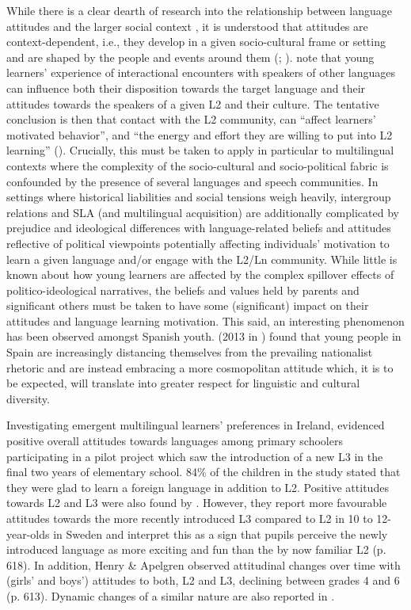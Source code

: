 \documentclass[output=paper]{../langscibook}
\begin{document}
While there is a clear dearth of research into the relationship between language attitudes and the larger social context \citep[28]{Enever2009}, it is understood that attitudes are context-dependent, i.e., they develop in a given socio-cultural frame or setting and are shaped by the people and events around them (\citealt[91]{JessnerMayer2017}; \citealt[25]{Munoz2014}). \citet{CsizerKormos2009} note that young learners’ experience of interactional encounters with speakers of other languages can influence both their disposition towards the target language and their attitudes towards the speakers of a given L2 and their culture. The tentative conclusion is then that contact with the L2 community, can “affect learners’ motivated behavior”, and “the energy and effort they are willing to put into L2 learning” (\citealt[63]{CsizerKormos2009}). Crucially, this must be taken to apply in particular to multilingual contexts where the complexity of the socio-cultural and socio-political fabric is confounded by the presence of several languages and speech communities. In settings where historical liabilities and social tensions weigh heavily, intergroup relations and SLA (and multilingual acquisition) are additionally complicated by prejudice and ideological differences with language-related beliefs and attitudes reflective of political viewpoints potentially affecting individuals’ motivation to learn a given language and/or engage with the L2/Ln community. While little is known about how young learners are affected by the complex spillover effects of politico-ideological narratives, the beliefs and values held by parents and significant others must be taken to have some (significant) impact on their attitudes and language learning motivation. This said, an interesting phenomenon has been observed amongst Spanish youth. \citeauthor{WoolardFrekko2013} (2013 in \citealt[586]{Lasagabaster2017}) found that young people in Spain are increasingly distancing themselves from the prevailing nationalist rhetoric and are instead embracing a more cosmopolitan attitude which, it is to be expected, will translate into greater respect for linguistic and cultural diversity.

Investigating emergent multilingual learners’ preferences in Ireland, \citet[4]{HarrisEtAl2009} evidenced positive overall attitudes towards languages among primary schoolers participating in a pilot project which saw the introduction of a new L3 in the final two years of elementary school. 84\% of the children in the study stated that they were glad to learn a foreign language in addition to L2. Positive attitudes towards L2 and L3 were also found by \citet{HenryApelgren2008}. However, they report more favourable attitudes towards the more recently introduced L3 compared to L2 in 10 to 12-year-olds in Sweden and interpret this as a sign that pupils perceive the newly introduced language as more exciting and fun than the by now familiar L2 (p. 618). In addition, Henry \& Apelgren observed attitudinal changes over time with (girls’ and boys’) attitudes to both, L2 and L3, declining between grades 4 and 6 (p. 613). Dynamic changes of a similar nature are also reported in \citet[214]{Cenoz2004}. 
\end{document}
